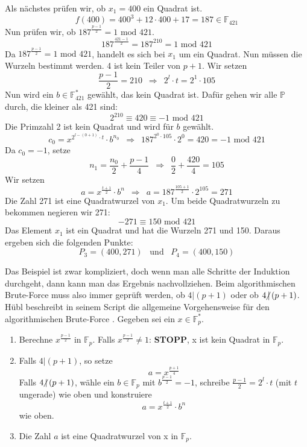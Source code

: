 Als nächstes prüfen wir, ob $x_1 = 400$ ein Quadrat ist. $$f(400) =  400^{3} + 12 \cdot 400 + 17 = 187 \in \mathbb{F}_{421}$$ Nun prüfen wir, ob $187^{\frac{p - 1}{2}} = 1 \text{ mod } 421$. $$187^{\frac{421 - 1}{2}} = 187^210 = 1 \text{ mod } 421$$ Da $187^{\frac{p - 1}{2}} = 1 \text{ mod } 421$, handelt es sich bei $x_1$ um ein Quadrat. Nun müssen die Wurzeln bestimmt werden. 4 ist kein Teiler von $p + 1$. Wir setzen $$\frac{p - 1}{2} = 210 \enspace \Longrightarrow \enspace 2^l \cdot t = 2^1 \cdot 105$$ Nun wird ein $b \in \mathbb{F}_{421}^*$ gewählt, das kein Quadrat ist. Dafür gehen wir alle $\mathbb{P}$ durch, die kleiner als 421 sind: $$2^210 \equiv 420 \equiv - 1 \text{ mod } 421$$ Die Primzahl 2 ist kein Quadrat und wird für $b$ gewählt. $$c_0 = x^{2^{l - (0 + 1)} \cdot t} \cdot b^{n_0} \enspace \Longrightarrow \enspace 187^{2^{0} \cdot 105} \cdot 2^0 = 420 = - 1 \text{ mod } 421$$ Da $c_0 = - 1$, setze $$n_{1} = \frac{n_0}{2} + \frac{p - 1}{4} \enspace \Longrightarrow \enspace \frac{0}{2} + \frac{420}{4} = 105$$ Wir setzen $$a = x^{\frac{t + 1}{2}} \cdot b^n  \enspace \Longrightarrow \enspace a = 187^{\frac{105 + 1}{2}} \cdot 2^105 = 271$$ Die Zahl 271 ist eine Quadratwurzel von $x_1$. Um beide Quadratwurzeln zu bekommen negieren wir 271: $$- 271 \equiv 150 \text{ mod } 421$$ Das Element $x_1$ ist ein Quadrat und hat die Wurzeln 271 und 150. Daraus ergeben sich die folgenden Punkte: $$P_3 = (400, 271) \enspace \text{ und } \enspace P_4 = (400, 150)$$

Das Beispiel ist zwar kompliziert, doch wenn man alle Schritte der Induktion durchgeht, dann kann man das Ergebnis nachvollziehen. Beim algorithmischen Brute-Force muss also immer geprüft werden, ob $4 | (p + 1)$ oder ob $4 \hspace{-0.4em}\not\hspace{0.025em}|\, (p + 1)$. Hübl beschreibt in seinem Script die allgemeine Vorgehensweise für den algorithmischen Brute-Force \cite[S. 271-272]{Dr.ReinholdHubl.2022}. Gegeben sei ein $x \in \mathbb{F}_p^*$.

\begin{enumerate}
\item Berechne $x^{\frac{p - 1}{2}}$ in $\mathbb{F}_p$. Falls $x^{\frac{p - 1}{2}} \neq 1$: \textbf{STOPP}, x ist kein Quadrat in $\mathbb{F}_p$.
\item Falls $4 | (p + 1)$, so setze $$a =  x^{\frac{p + 1}{4}}$$ Falls $4 \hspace{-0.4em}\not\hspace{0.025em}|\, (p + 1)$, wähle ein $b \in \mathbb{F}_p$ mit $b^{\frac{p - 1}{2}} = -1$, schreibe $\frac{p - 1}{2} = 2^l \cdot t$ (mit $t$ ungerade) wie oben und konstruiere $$a =  x^{\frac{t + 1}{2}} \cdot b^n$$ wie oben.
\item Die Zahl $a$ ist eine Quadratwurzel von x in $\mathbb{F}_p$.
\end{enumerate}

